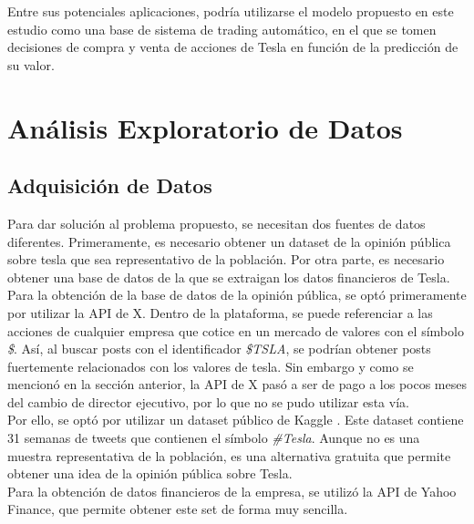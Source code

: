 \documentclass[a4paper, 12pt]{report}
\begin{document}
                Entre sus potenciales aplicaciones, podría utilizarse el modelo propuesto en este estudio como una base de sistema de trading automático,
                en el que se tomen decisiones de compra y venta de acciones de Tesla en función de la predicción de su valor.\\


    \chapter{Análisis Exploratorio de Datos}

        \section{Adquisición de Datos}

                Para dar solución al problema propuesto, se necesitan dos fuentes de datos diferentes. Primeramente, es necesario obtener un dataset de la opinión pública sobre tesla
                 que sea representativo de la población. Por otra parte, es necesario obtener una base de datos de la que se extraigan los datos financieros de Tesla.\\

                Para la obtención de la base de datos de la opinión pública, se optó primeramente por utilizar la API de X. Dentro de la plataforma, se puede referenciar a las 
                acciones de cualquier empresa que cotice en un mercado de valores con el símbolo \textit{\$}. Así, al buscar posts con el identificador \textit{\$TSLA},
                se podrían obtener posts fuertemente relacionados con los valores de tesla. Sin embargo y como se mencionó en la sección anterior, la API de X pasó a ser de pago 
                a los pocos meses del cambio de director ejecutivo, por lo que no se pudo utilizar esta vía.\\

                Por ello, se optó por utilizar un dataset público de Kaggle \cite{shafaghi2022}. Este dataset contiene 31 semanas de tweets que contienen el símbolo \textit{\#Tesla}.
                Aunque no es una muestra representativa de la población, es una alternativa gratuita que permite obtener una idea de la opinión pública sobre Tesla.\\

                Para la obtención de datos financieros de la empresa, se utilizó la API de Yahoo Finance, que permite obtener este set de forma muy sencilla.\\
\end{document}
